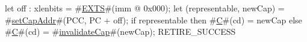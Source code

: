 let off : xlenbits = #\hyperref[sailRISCVzEXTS]{EXTS}#(imm @ 0x000);
let (representable, newCap) = #\hyperref[sailRISCVzsetCapAddr]{setCapAddr}#(PCC, PC + off);
if representable then
  #\hyperref[sailRISCVzC]{C}#(cd) = newCap
else
  #\hyperref[sailRISCVzC]{C}#(cd) = #\hyperref[sailRISCVzinvalidateCap]{invalidateCap}#(newCap);
RETIRE_SUCCESS
